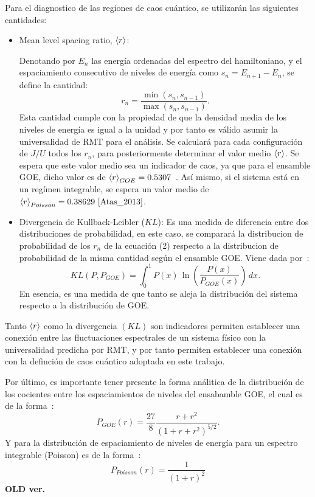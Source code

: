 \documentclass[spanish,titlepage,table]{practicas}
\begin{document}
Para el diagnostico de las regiones de caos cuántico, se utilizarán las siguientes cantidades:
\begin{itemize}
    \item Mean level spacing ratio, $\ev{r}$:

Denotando por $E_n$ las energía ordenadas del espectro del hamiltoniano, y el espaciamiento consecutivo de niveles de energía como 
    $s_n=E_{n+1}-E_{n}$, se define la cantidad:
		\begin{equation}
			r_n=\frac{\min(s_n,s_{n-1})}{\max(s_n,s_{n-1})}.
		\end{equation}
    Esta cantidad cumple con la propiedad de que la densidad media de los niveles de energía es igual a la unidad
    y por tanto es válido asumir la universalidad de RMT para el análisis.
    Se calculará para cada configuración de $J/U$ todos los $r_n$, para posteriormente determinar el valor medio $\ev{r}$.
    Se espera que este valor medio sea un indicador de caos, ya que para el ensamble GOE, dicho valor es de $\ev{r}_{GOE}=0.5307$~\cite{Atas_2013}. Así mismo, si el sistema está 
    en un regímen integrable, se espera un valor medio de $\ev{r}_{Poisson}=0.38629~\cite{Atas_2013}$.
    \item Divergencia de Kullback-Leibler ($KL$): Es una medida de diferencia entre dos distribuciones de probabilidad, en este caso, se comparará la distribucion de probabilidad de los $r_n$ de la ecuación (2)
    respecto a la distribucion de probabilidad de la misma cantidad según el ensamble GOE. Viene dada por~\cite{Pausch2022}:
    \begin{equation}
KL(P,P_{GOE}) = \int_{0}^{1} P(x) \, \ln \left( \frac{P(x)}{P_{GOE}(x)} \right) \, dx.
    \end{equation}
    En esencia, es una medida de que tanto se aleja la distribución del sistema respecto a la distribución de GOE.   
\end{itemize}
Tanto $\ev{r}$ como la divergencia $(KL)$ son indicadores permiten establecer una conexión entre las fluctuaciones espectrales de un sistema físico 
con la universalidad predicha por RMT, y por tanto permiten establecer una conexión con la definción de caos cuántico adoptada en este trabajo.

Por último, es importante tener presente la forma análitica de la distribución de los cocientes entre los espaciamientos de niveles del ensabamble GOE, el cual es de la forma~\cite{Atas_2013}:
\begin{equation}
    P_{GOE}(r)=\frac{27}{8}\frac{r+r^{2}}{(1+r+r^{2})^{5/2}}.
\end{equation}
Y para la distribución de espaciamiento de niveles de energía para un espectro integrable (Poisson) es de la forma~\cite{Tekur2020}:
\begin{equation}
    P_{Poisson}(r)=\frac{1}{(1+r)^{2}}
\end{equation}
\textbf{OLD ver.}
\end{document}
